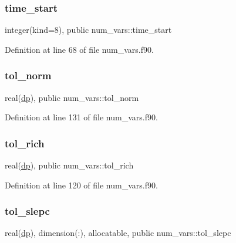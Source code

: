 \subsubsection{\texorpdfstring{time\+\_\+start}{time\_start}}
{\footnotesize\ttfamily integer(kind=8), public num\+\_\+vars\+::time\+\_\+start}



Definition at line 68 of file num\+\_\+vars.\+f90.

\mbox{\label{namespacenum__vars_a301b25f19135f2bee8ccce99257ae86c}} 
\subsubsection{\texorpdfstring{tol\+\_\+norm}{tol\_norm}}
{\footnotesize\ttfamily real(\hyperlink{namespacenum__vars_a03802aa2bd86439d7a9370836fabf3f2}{dp}), public num\+\_\+vars\+::tol\+\_\+norm}



Definition at line 131 of file num\+\_\+vars.\+f90.

\mbox{\label{namespacenum__vars_aa0091a935b9502afef09a87c0f590e9d}} 
\subsubsection{\texorpdfstring{tol\+\_\+rich}{tol\_rich}}
{\footnotesize\ttfamily real(\hyperlink{namespacenum__vars_a03802aa2bd86439d7a9370836fabf3f2}{dp}), public num\+\_\+vars\+::tol\+\_\+rich}



Definition at line 120 of file num\+\_\+vars.\+f90.

\mbox{\label{namespacenum__vars_acbfccf15a8af9fce37f9cb3f2c85be76}} 
\subsubsection{\texorpdfstring{tol\+\_\+slepc}{tol\_slepc}}
{\footnotesize\ttfamily real(\hyperlink{namespacenum__vars_a03802aa2bd86439d7a9370836fabf3f2}{dp}), dimension(\+:), allocatable, public num\+\_\+vars\+::tol\+\_\+slepc}




